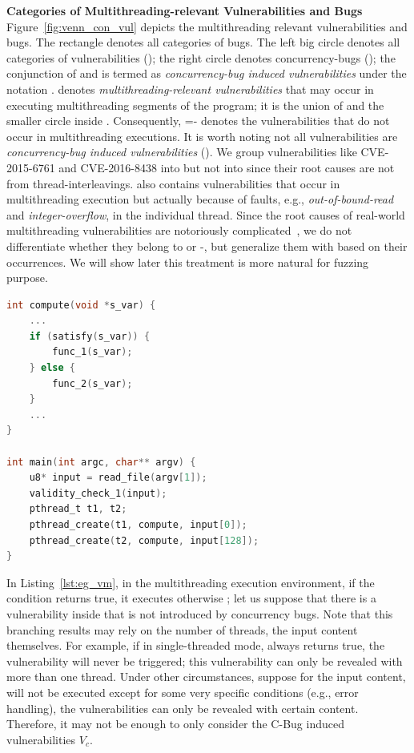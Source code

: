 {\noindent\textbf{ Categories of Multithreading-relevant Vulnerabilities and Bugs}\quad} Figure~\ref{fig:venn_con_vul} depicts the multithreading relevant vulnerabilities and bugs. The rectangle denotes all categories of bugs. The left big circle denotes all categories of vulnerabilities ({\vuls}); the right circle denotes concurrency-bugs ({\cbugs}); the conjunction of {\vuls} and {\cbugs} is termed as \emph{concurrency-bug induced vulnerabilities} under the notation {\vulsCB}. {\vulsMT} denotes \emph{multithreading-relevant vulnerabilities} that may occur in executing multithreading segments of the program; it is the union of {\vulsCB} and the smaller circle inside \vuls. Consequently, \mbox{{\vulsST}={\vuls}-{\vulsMT}} denotes the vulnerabilities that do not occur in multithreading executions. It is worth noting not all {\vulsMT} vulnerabilities are \emph{concurrency-bug induced vulnerabilities} (\vulsCB). We group vulnerabilities like CVE-2015-6761 and CVE-2016-8438 into {\vulsMT} but not into {\vulsCB} since their root causes are not from thread-interleavings. {\vulsMT} also contains vulnerabilities that occur in multithreading execution but actually because of faults, e.g., \emph{out-of-bound-read} and \emph{integer-overflow}, in the individual thread. Since the root causes of real-world multithreading vulnerabilities are notoriously complicated~\cite{mtbugs_survey}, we do not differentiate whether they belong to {\vulsCB} or {\vulsMT-\vulsCB}, but generalize them with {\vulsMT} based on their occurrences. We will show later this treatment is more natural for fuzzing purpose.

\begin{lstlisting}[language=C,float=ht,caption={An Example Illustrating the vulnerability lies in $V_m$ but not $V_c$.},label={lst:eg_vm}]
int compute(void *s_var) {
    ...
    if (satisfy(s_var)) {
        func_1(s_var);
    } else {
        func_2(s_var);
    }
    ...
}

int main(int argc, char** argv) {
    u8* input = read_file(argv[1]);
    validity_check_1(input);
    pthread_t t1, t2;
    pthread_create(t1, compute, input[0]);
    pthread_create(t2, compute, input[128]);
}	
\end{lstlisting}

In Listing~\ref{lst:eg_vm}, in the multithreading execution environment, if the condition  returns true, it executes  otherwise ; let us suppose that there is a vulnerability inside  that is not introduced by concurrency bugs. Note that this branching results may rely on the number of threads, the input content themselves. For example, if in single-threaded mode,  always returns true, the vulnerability will never be triggered; this vulnerability can only be revealed with more than one thread. Under other circumstances, suppose for the input content,  will not be executed except for some very specific conditions (e.g., error handling), the vulnerabilities can only be revealed with certain content. Therefore, it may not be enough to only consider the \textsf{C-Bug} induced vulnerabilities $V_c$.


